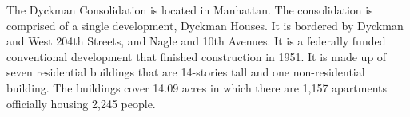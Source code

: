  

  

The Dyckman Consolidation is located in Manhattan. The consolidation is comprised of a single development, Dyckman Houses. It is bordered by Dyckman and West 204th Streets, and Nagle and 10th Avenues. It is a federally funded conventional development that finished construction in 1951. It is made up of seven residential buildings that are 14-stories tall and one non-residential building. The buildings cover 14.09 acres in which there are 1,157 apartments officially housing 2,245 people.   